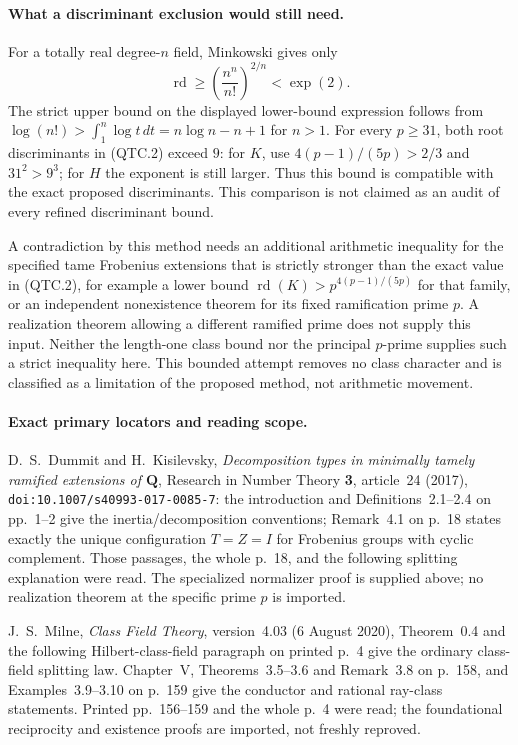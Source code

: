 \paragraph{What a discriminant exclusion would still need.}
For a totally real degree-$n$ field, Minkowski gives only
\[
 \operatorname{rd}\ge
       \left(\frac{n^n}{n!}\right)^{2/n}<\exp(2).      \tag{QTC.6}
\]
The strict upper bound on the displayed lower-bound expression follows
from $\log(n!)>\int_1^n\log t\,dt=n\log n-n+1$ for $n>1$.
For every $p\ge31$, both root discriminants in (QTC.2) exceed $9$:
for $K$, use $4(p-1)/(5p)>2/3$ and $31^2>9^3$; for $H$
the exponent is still larger.  Thus this bound is compatible with
the exact proposed discriminants.  This comparison is not claimed
as an audit of every refined discriminant bound.

A contradiction by this method needs an additional arithmetic
inequality for the specified tame Frobenius extensions that is
strictly stronger than the exact value in (QTC.2), for example a
lower bound $\operatorname{rd}(K)>p^{4(p-1)/(5p)}$ for that family,
or an independent nonexistence theorem for its fixed ramification
prime $p$.  A realization theorem allowing a different ramified prime
does not supply this input.  Neither the length-one class bound nor
the principal $p$-prime supplies such a strict inequality here.
This bounded attempt removes no class character and is classified
as a limitation of the proposed method, not arithmetic movement.

\paragraph{Exact primary locators and reading scope.}
D.~S.~Dummit and H.~Kisilevsky,
\emph{Decomposition types in minimally tamely ramified extensions
of $\mathbf Q$}, Research in Number Theory \textbf{3}, article~24
(2017), \texttt{doi:10.1007/s40993-017-0085-7}:
the introduction and Definitions~2.1--2.4 on pp.~1--2 give the
inertia/decomposition conventions; Remark~4.1 on p.~18 states
exactly the unique configuration $T=Z=I$ for Frobenius groups with
cyclic complement.  Those passages, the whole p.~18, and the
following splitting explanation were read.  The specialized
normalizer proof is supplied above; no realization theorem at the
specific prime $p$ is imported.

J.~S.~Milne, \emph{Class Field Theory}, version~4.03
(6 August 2020), Theorem~0.4 and the following Hilbert-class-field
paragraph on printed p.~4 give the ordinary class-field splitting
law.  Chapter~V, Theorems~3.5--3.6 and Remark~3.8 on p.~158,
and Examples~3.9--3.10 on p.~159 give the conductor and rational
ray-class statements.  Printed pp.~156--159 and the whole p.~4
were read; the foundational reciprocity and existence proofs are
imported, not freshly reproved.

